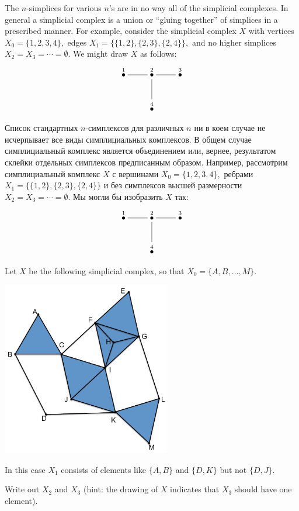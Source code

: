 \documentclass[CT4S-EN-RU]{subfiles}
\begin{document}
\begin{blockENG}
The $n$-simplices for various $n$'s are in no way all of the simplicial complexes. In general a simplicial complex is a union or “gluing together” of simplices in a prescribed manner. For example, consider the simplicial complex $X$ with vertices $X_0=\{1,2,3,4\},$ edges $X_1=\{\{1,2\},\{2,3\},\{2,4\}\},$ and no higher simplices $X_2=X_3=\cdots=\emptyset.$ We might draw $X$ as follows:
$$\xymatrix{\LMO{1}\ar@{-}[r]&\LMO{2}\ar@{-}[r]\ar@{-}[d]&\LMO{3}\\&\LMO{4}}$$
\end{blockENG}

\begin{blockRUS}
Список стандартных $n$-симплексов для различных $n$ ни в коем случае не исчерпывает все виды симплициальных комплексов. В общем случае симплициальный комплекс является объединением или, вернее, результатом склейки отдельных симплексов предписанным образом. Например, рассмотрим симплициальный комплекс $X$ с вершинами $X_0=\{1,2,3,4\},$ ребрами $X_1=\{\{1,2\},\{2,3\},\{2,4\}\}$ и без симплексов высшей размерности $X_2=X_3=\cdots=\emptyset.$ Мы могли бы изобразить $X$ так:
$$\xymatrix{\LMO{1}\ar@{-}[r]&\LMO{2}\ar@{-}[r]\ar@{-}[d]&\LMO{3}\\&\LMO{4}}$$
\end{blockRUS}

\begin{exerciseENG}
Let $X$ be the following simplicial complex, so that $X_0=\{A,B,\ldots,M\}.$ 
\begin{center}
\includegraphics[height=3in]{OlogNetwork5}
\end{center} 
In this case $X_1$ consists of elements like $\{A,B\}$ and $\{D,K\}$ but not $\{D,J\}.$ 

Write out $X_2$ and $X_3$ (hint: the drawing of $X$ indicates that $X_3$ should have one element).
\end{exerciseENG}
\end{document}
